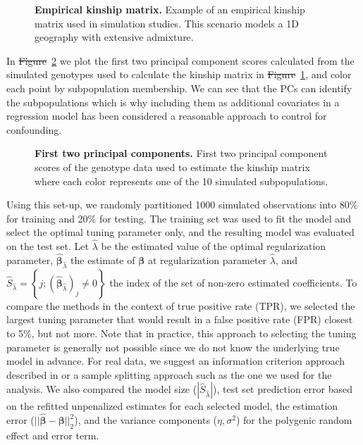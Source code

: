 \documentclass[10pt,letterpaper]{article}
\newcommand{\bbeta}{\boldsymbol{\beta}}
\providecommand{\DIFaddtex}[1]{{\protect\color{blue}\uwave{#1}}} %
\providecommand{\DIFdeltex}[1]{{\protect\color{red}\sout{#1}}}                      %
\providecommand{\DIFaddbegin}{} %
\providecommand{\DIFaddend}{} %
\providecommand{\DIFdelbegin}{} %
\providecommand{\DIFdelend}{} %
\providecommand{\DIFadd}[1]{\texorpdfstring{\DIFaddtex{#1}}{#1}} %
\providecommand{\DIFdel}[1]{\texorpdfstring{\DIFdeltex{#1}}{}} %
\newcommand{\DIFscaledelfig}{0.5}
\newlength{\DIFdelgraphicswidth} %
\newlength{\DIFdelgraphicsheight} %
\newcommand{\DIFaddincludegraphics}[2][]{{\color{blue}\fbox{\DIFOincludegraphics[#1]{#2}}}} %
\newcommand{\DIFdelincludegraphics}[2][]{%
\sbox{\DIFdelgraphicsbox}{\DIFOincludegraphics[#1]{#2}}%
\settoboxwidth{\DIFdelgraphicswidth}{\DIFdelgraphicsbox} %
\settoboxtotalheight{\DIFdelgraphicsheight}{\DIFdelgraphicsbox} %
\scalebox{\DIFscaledelfig}{%
\parbox[b]{\DIFdelgraphicswidth}{\usebox{\DIFdelgraphicsbox}\\[-\baselineskip] \rule{\DIFdelgraphicswidth}{0em}}\llap{\resizebox{\DIFdelgraphicswidth}{\DIFdelgraphicsheight}{%
\setlength{\unitlength}{\DIFdelgraphicswidth}%
\begin{picture}(1,1)%
\thicklines\linethickness{2pt} %
{\color[rgb]{1,0,0}\put(0,0){\framebox(1,1){}}}%
{\color[rgb]{1,0,0}\put(0,0){\line( 1,1){1}}}%
{\color[rgb]{1,0,0}\put(0,1){\line(1,-1){1}}}%
\end{picture}%
}\hspace*{3pt}}} %
} %
\DeclareRobustCommand{\DIFaddbegin}{\DIFOaddbegin \let\includegraphics\DIFaddincludegraphics} %
\DeclareRobustCommand{\DIFaddend}{\DIFOaddend \let\includegraphics\DIFOincludegraphics} %
\DeclareRobustCommand{\DIFdelbegin}{\DIFOdelbegin \let\includegraphics\DIFdelincludegraphics} %
\DeclareRobustCommand{\DIFdelend}{\DIFOaddend \let\includegraphics\DIFOincludegraphics} %
\begin{document}
\begin{figure}[!h]
	\caption{{\bf Empirical kinship matrix.}
		Example of an empirical kinship matrix used in simulation studies. This scenario models a 1D geography with extensive admixture.}
	\label{fig:plot-kinship-sim}
\end{figure}



In \DIFdelbegin \DIFdel{Figure}\DIFdelend \DIFaddbegin \DIFadd{Fig}\DIFaddend ~\ref{fig:plot-pc-sim} we plot the first two principal component scores calculated from the simulated genotypes used to calculate the kinship matrix in \DIFdelbegin \DIFdel{Figure}\DIFdelend \DIFaddbegin \DIFadd{Fig}\DIFaddend ~\ref{fig:plot-kinship-sim}, and color each point by subpopulation membership. We can see that the PCs can identify the subpopulations which is why including them as additional covariates in a regression model has been considered a reasonable approach to control for confounding.


\begin{figure}[!h]
	\caption{{\bf First two principal components.}
		First two principal component scores of the genotype data used to estimate the kinship matrix where each color represents one of the 10 simulated subpopulations.}
	\label{fig:plot-pc-sim}
\end{figure}


Using this set-up, we randomly partitioned 1000 simulated observations into 80\% for training and 20\% for testing. The training set was used to fit the model and select the optimal tuning parameter only, and the resulting model was evaluated on the test set. Let $\hat{\lambda}$ be the estimated value of the optimal regularization parameter, $\widehat{\bbeta}_{\hat{\lambda}}$ the estimate of $\bbeta$ at regularization parameter $\hat{\lambda}$, and $\widehat{S}_{\hat{\lambda}} = \left\lbrace j; (\widehat{\bbeta}_{\hat{\lambda}})_j \neq 0 \right\rbrace$ the index of the set of non-zero estimated coefficients. To compare the methods in the context of true positive rate (TPR), we selected the largest tuning parameter that would result in a false positive rate (FPR) closest to 5\%, but not more. Note that in practice, this approach to selecting the tuning parameter is generally not possible since we do not know the underlying true model in advance. For real data, we suggest an information criterion approach described in  or a sample splitting approach such as the one we used for the  analysis. We also compared the model size ($|\widehat{S}_{\hat{\lambda}}|$), test set prediction error based on the refitted unpenalized estimates for each selected model, the estimation error ($||\widehat{\bbeta} - \bbeta||_2^2$), and the variance components ($\eta, \sigma^2$) for the polygenic random effect and error term. 
\end{document}
